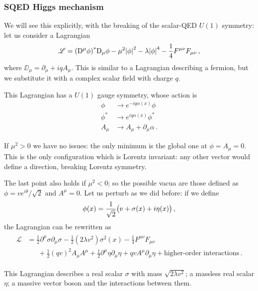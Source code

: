 \documentclass[main.tex]{subfiles}
\begin{document}
\subsubsection{SQED Higgs mechanism}

We will see this explicitly, with the breaking of the scalar-QED \(U(1)\) symmetry: let us consider a Lagrangian 
%
\begin{align}
\mathscr{L} = \qty(\mathrm{D}^{\mu } \phi )^{*} \mathrm{D}_{\mu } \phi 
- \mu^2 \abs{\phi}^2 - \lambda \abs{\phi }^4
- \frac{1}{4} F^{\mu \nu } F_{\mu \nu }
\,,
\end{align}
%
where \(\DD_{\mu } = \partial_{\mu } + iq A_{\mu} \).
This is similar to a Lagrangian describing a fermion, but we substitute it with a complex scalar field with charge \(q\). 

This Lagrangian has a \(U(1)\) gauge symmetry, whose action is 
%
\begin{align}
\phi &\to e^{-iq \alpha (x)} \phi \\
\phi^{*} &\to e^{iq \alpha (x)} \phi^{*} \\
A_{\mu } &\to A_{\mu } + \partial_{\mu } \alpha     
\,.
\end{align}

If \(\mu^2>0\) we have no issues: the only minimum is the global one at \(\phi = A_{\mu } = 0\). This is the only configuration which is Lorentz invariant: any other vector would define a direction, breaking Lorentz symmetry. 

The last point also holds if \(\mu^2 < 0\); so the possible vacua are those defined as \(\phi = v e^{i \theta } / \sqrt{2}\) and \(A^{\mu } = 0 \).
Let us perturb as we did before: if we define 
%
\begin{align}
\phi (x) = \frac{1}{\sqrt{2}} \qty(v + \sigma (x) + i \eta (x))
\,,
\end{align}
%
the Lagrangian can be rewritten as 
%
\begin{align}
\begin{split}
\mathscr{L} &= \frac{1}{2} \partial^{\mu } \sigma \partial_{\mu }\sigma 
- \frac{1}{2} (2 \lambda v^2) \sigma^2(x)  
- \frac{1}{4} F^{\mu \nu } F_{\mu \nu } \\
&\phantom{=}\ 
+ \frac{1}{2} (q v)^2 A_{\mu } A^{\mu }
+ \frac{1}{2} \partial^{\mu }\eta \partial_{\mu } \eta 
+ qv A^{\mu } \partial_{\mu } \eta 
+ \text{higher-order interactions}   
\,.
\end{split}
\end{align}

This Lagrangian describes a real scalar \(\sigma \) with mass \(\sqrt{2 \lambda v^2}\); a massless real scalar \(\eta \); a massive vector boson and the interactions between them. 
\end{document}
